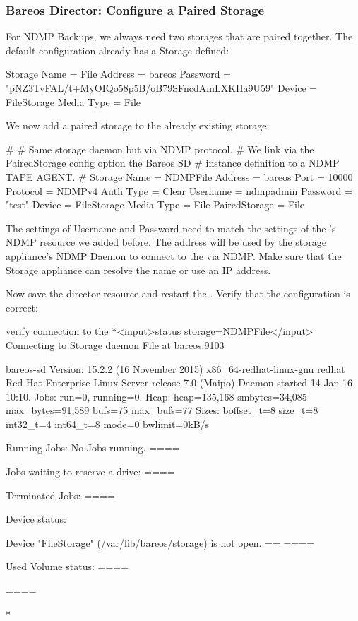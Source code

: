 \subsubsection{Bareos Director: Configure a Paired Storage}

For NDMP Backups, we always need two storages that are paired together.
The default configuration already has a Storage  defined:

\begin{bconfig}{}
Storage {
  Name = File
  Address = bareos
  Password = "pNZ3TvFAL/t+MyOIQo58p5B/oB79SFncdAmLXKHa9U59"
  Device = FileStorage
  Media Type = File
}
\end{bconfig}

We now add a paired storage to the already existing  storage:
\begin{bconfig}{}
#
# Same storage daemon but via NDMP protocol.
# We link via the PairedStorage config option the Bareos SD
# instance definition to a NDMP TAPE AGENT.
#
Storage {
  Name = NDMPFile
  Address = bareos
  Port = 10000
  Protocol = NDMPv4
  Auth Type = Clear
  Username = ndmpadmin
  Password = "test"
  Device = FileStorage
  Media Type = File
  PairedStorage = File
}
\end{bconfig}

The settings of Username and Password need to match the settings of the \bareosSd's NDMP resource we added before.
The address will be used by the storage appliance's NDMP Daemon to connect to the \bareosSd via NDMP.
Make sure that the Storage appliance can resolve the name or use an IP address.

Now save the director resource and restart the \bareosDir.
Verify that the configuration is correct:

\begin{bconsole}{verify connection to the \bareosSd}
*<input>status storage=NDMPFile</input>
Connecting to Storage daemon File at bareos:9103

bareos-sd Version: 15.2.2 (16 November 2015) x86_64-redhat-linux-gnu redhat Red Hat Enterprise Linux Server release 7.0 (Maipo)
Daemon started 14-Jan-16 10:10. Jobs: run=0, running=0.
 Heap: heap=135,168 smbytes=34,085 max_bytes=91,589 bufs=75 max_bufs=77
 Sizes: boffset_t=8 size_t=8 int32_t=4 int64_t=8 mode=0 bwlimit=0kB/s

Running Jobs:
No Jobs running.
====

Jobs waiting to reserve a drive:
====

Terminated Jobs:
====

Device status:

Device "FileStorage" (/var/lib/bareos/storage) is not open.
==
====

Used Volume status:
====

====

*
\end{bconsole}

